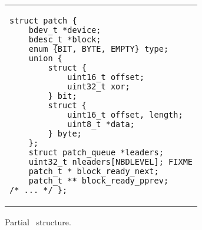 \section {\ChDescs}
\label{sec:chdescs}

\newcommand{\ChAll}{\ensuremath{\textit{All}}}
\newcommand{\ChAllB}[1]{\ensuremath{\textit{All}[#1]}}
\newcommand{\ChMem}{\ensuremath{\textit{Mem}}}
\newcommand{\ChMemB}[1]{\ensuremath{\textit{Mem}[#1]}}
\newcommand{\ChDisk}{\ensuremath{\textit{Disk}}}
\newcommand{\ChDiskB}[1]{\ensuremath{\textit{Disk}[#1]}}
\newcommand{\ChInf}{\ensuremath{\textit{Inf}}}
\newcommand{\ChInfB}[1]{\ensuremath{\textit{Inf\/}[#1]}}
\newcommand{\ChRb}{\ensuremath{\textit{\Rb}}}
\newcommand{\ChRbB}[1]{\ensuremath{\textit{\Rb}[#1]}}
\newcommand{\ChNrb}{\ensuremath{\textit{\Nrb}}}
\newcommand{\ChNrbB}[1]{\ensuremath{\textit{\Nrb}[#1]}}

\newcommand{\Before}[1]{\ensuremath{\textit{Pre}[#1]}}
\newcommand{\BeforeS}[1]{\ensuremath{\textit{Pre}^*[#1]}}
\newcommand{\After}[1]{\ensuremath{\textit{Post}[#1]}}
\newcommand{\AfterS}[1]{\ensuremath{\textit{Post}^*[#1]}}

\newcommand{\statenone}{\ensuremath{\textit{inmem}}}
\newcommand{\stateinf}{\ensuremath{\textit{inflight}}}
\newcommand{\statedisk}{\ensuremath{\textit{ondisk}}}

\begin{figure}[t]
\vskip-14pt
\begin{tabular}{@{\hskip0.58in}p{2in}@{}}
\begin{scriptsize}
\begin{verbatim}
struct patch {
    bdev_t *device;
    bdesc_t *block;
    enum {BIT, BYTE, EMPTY} type;
    union {
        struct {
            uint16_t offset;
            uint32_t xor;
        } bit;
        struct {
            uint16_t offset, length;
            uint8_t *data;
        } byte;
    };
    struct patch_queue *leaders;
    uint32_t nleaders[NBDLEVEL]; FIXME
    patch_t * block_ready_next;
    patch_t ** block_ready_pprev;
/* ... */ };
\end{verbatim}
\end{scriptsize}
\end{tabular}
\vspace{-10pt}
\caption{\label{fig:chdesc} Partial \chdesc\ structure.}
\end{figure}

